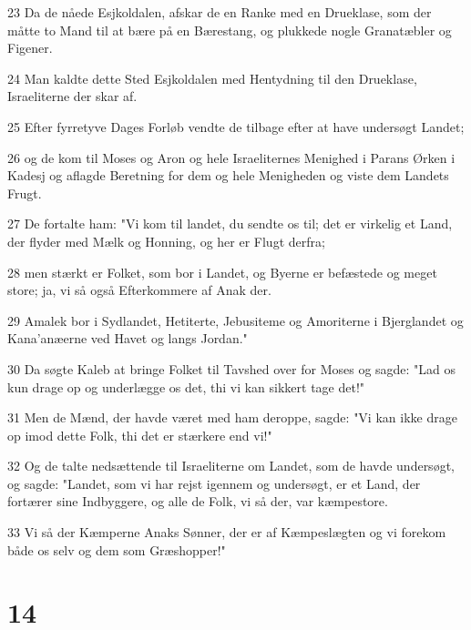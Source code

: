 \par 23 Da de nåede Esjkoldalen, afskar de en Ranke med en Drueklase, som der måtte to Mand til at bære på en Bærestang, og plukkede nogle Granatæbler og Figener.
\par 24 Man kaldte dette Sted Esjkoldalen med Hentydning til den Drueklase, Israeliterne der skar af.
\par 25 Efter fyrretyve Dages Forløb vendte de tilbage efter at have undersøgt Landet;
\par 26 og de kom til Moses og Aron og hele Israeliternes Menighed i Parans Ørken i Kadesj og aflagde Beretning for dem og hele Menigheden og viste dem Landets Frugt.
\par 27 De fortalte ham: "Vi kom til landet, du sendte os til; det er virkelig et Land, der flyder med Mælk og Honning, og her er Flugt derfra;
\par 28 men stærkt er Folket, som bor i Landet, og Byerne er befæstede og meget store; ja, vi så også Efterkommere af Anak der.
\par 29 Amalek bor i Sydlandet, Hetiterte, Jebusiteme og Amoriterne i Bjerglandet og Kana'anæerne ved Havet og langs Jordan."
\par 30 Da søgte Kaleb at bringe Folket til Tavshed over for Moses og sagde: "Lad os kun drage op og underlægge os det, thi vi kan sikkert tage det!"
\par 31 Men de Mænd, der havde været med ham deroppe, sagde: "Vi kan ikke drage op imod dette Folk, thi det er stærkere end vi!"
\par 32 Og de talte nedsættende til Israeliterne om Landet, som de havde undersøgt, og sagde: "Landet, som vi har rejst igennem og undersøgt, er et Land, der fortærer sine Indbyggere, og alle de Folk, vi så der, var kæmpestore.
\par 33 Vi så der Kæmperne Anaks Sønner, der er af Kæmpeslægten og vi forekom både os selv og dem som Græshopper!"

\chapter{14}

